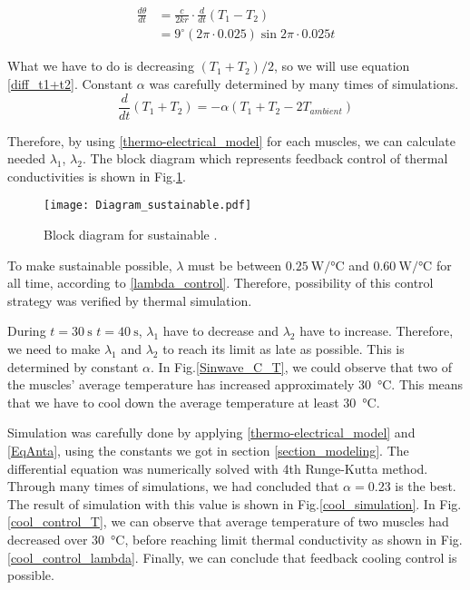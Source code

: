 \begin{equation} \label{theta_diff}
\begin{aligned} 
\frac{d\theta}{dt} & = \frac{c}{2kr}\cdot\frac{d}{dt}(T_{1}-T_{2}) \\
& = 9^{\circ}(2\pi\cdot 0.025)\sin{2\pi\cdot 0.025t} 
\end{aligned}
\end{equation}


What we have to do is decreasing $(T_{1}+T_{2})/2$, so we will use equation \eqref{diff_t1+t2}. Constant $\alpha$ was carefully determined by many times of simulations.
\begin{equation} \label{diff_t1+t2}
\frac{d}{dt}(T_{1}+T_{2}) = -\alpha(T_{1}+T_{2}-2T_{ambient})
\end{equation}

Therefore, by using \eqref{thermo-electrical_model} for each muscles, we can calculate needed $\lambda_{1}$, $\lambda_{2}$. The block diagram which represents feedback control of thermal conductivities is shown in Fig.\ref{diagram_sustainable}.

\begin{figure}[t]
	\centering\texttt{[image: Diagram\_sustainable.pdf]}
	\caption{Block diagram for sustainable \apcnospace.}
	\label{diagram_sustainable}
\end{figure}

To make sustainable \apc possible, $\lambda$ must be between $\SI{0.25}{\watt\per\degreeCelsius}$ and $\SI{0.60}{\watt\per\degreeCelsius}$ for all time, according to \eqref{lambda_control}. Therefore, possibility of this control strategy was verified by thermal simulation.

During $t=\SI{30}{\second}$ $t=\SI{40}{\second}$, $\lambda_{1}$ have to decrease and $\lambda_{2}$ have to increase. Therefore, we need to make $\lambda_{1}$ and $\lambda_{2}$ to reach its limit as late as possible. This is determined by constant $\alpha$. 
In Fig.\ref{Sinwave_C_T}, we could observe that two of the muscles' average temperature has increased approximately  \SI{30}{\degreeCelsius}. This means that we have to cool down the average temperature at least \SI{30}{\degreeCelsius}. 

Simulation was carefully done by applying \eqref{thermo-electrical_model} and \eqref{EqAnta}, using the constants we got in section \ref{section_modeling}. The differential equation was numerically solved with 4th Runge-Kutta method.
Through many times of simulations, we had concluded that $\alpha = 0.23$ is the best. The result of simulation with this value is shown in Fig.\ref{cool_simulation}. In Fig.\ref{cool_control_T}, we can observe that average temperature of two muscles had decreased over \SI{30}{\degreeCelsius}, before reaching limit thermal conductivity as shown in Fig.\ref{cool_control_lambda}. Finally, we can conclude that feedback cooling control is possible.

